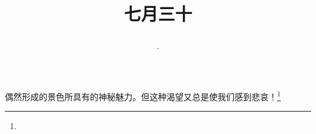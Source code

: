 \title{\date[d=2,m=9,y=2024][year:cn-y,年,month:cn,day:cn,日,·,weekday]·七月三十 }
偶然形成的景色所具有的神秘魅力。但这种渴望又总是使我们感到悲哀！\footnote{ }

